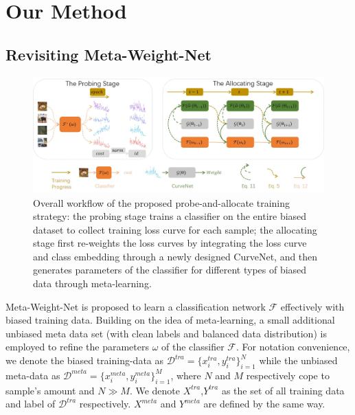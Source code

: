 \documentclass[letterpaper]{article} %
\begin{document}


\section{Our Method}
\subsection{Revisiting Meta-Weight-Net}
\label{sec:revisit}

\begin{figure}[t]
\begin{center}
   \includegraphics[width=0.85\linewidth]{figs/framework.jpg}
\end{center}
   \caption{Overall workflow of the proposed probe-and-allocate training strategy: the probing stage trains a classifier on the entire biased dataset to collect training loss curve for each sample; the allocating stage first re-weights the loss curves by integrating the loss curve and class embedding through a newly designed CurveNet, and then generates parameters of the classifier for different types of biased data through meta-learning.
   }
\label{fig:framework}
\end{figure}

Meta-Weight-Net is proposed to learn a classification network $\mathcal{F}$ effectively with biased training data.
Building on the idea of meta-learning, a small additional unbiased meta data set (with clean labels and balanced data distribution) is employed to refine the parameters $\omega$ of the classifier $\mathcal{F}$.
For notation convenience, we denote the biased training-data as $\mathcal{D}^{tra}=\{x^{tra}_i,y^{tra}_i\}_{i=1}^N$ while the unbiased meta-data as $\mathcal{D}^{meta}=\{x^{meta}_i,y^{meta}_i\}_{i=1}^M$,  where $N$ and $M$ respectively cope to sample's amount and $N \gg M$.
We denote $X^{tra}$,$Y^{tra}$ as the set of all training data and label of $\mathcal{D}^{tra}$ respectively.
$X^{meta}$ and $Y^{meta}$ are defined by the same way.
\end{document}
